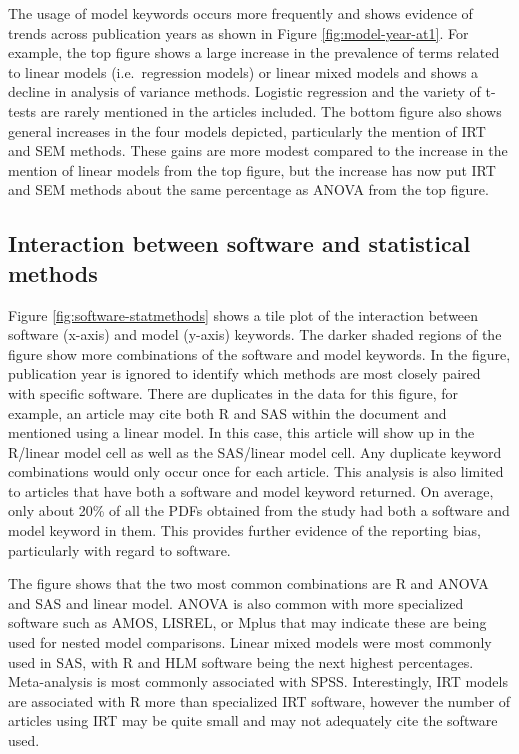\documentclass[
  english,
  ,man]{apa6}
\begin{document}
The usage of model keywords occurs more frequently and shows evidence of trends across publication years as shown in Figure \ref{fig:model-year-at1}. For example, the top figure shows a large increase in the prevalence of terms related to linear models (i.e.~regression models) or linear mixed models and shows a decline in analysis of variance methods. Logistic regression and the variety of t-tests are rarely mentioned in the articles included. The bottom figure also shows general increases in the four models depicted, particularly the mention of IRT and SEM methods. These gains are more modest compared to the increase in the mention of linear models from the top figure, but the increase has now put IRT and SEM methods about the same percentage as ANOVA from the top figure.

\hypertarget{interaction-between-software-and-statistical-methods}{%
\subsection{Interaction between software and statistical methods}\label{interaction-between-software-and-statistical-methods}}

Figure \ref{fig:software-statmethods} shows a tile plot of the interaction between software (x-axis) and model (y-axis) keywords. The darker shaded regions of the figure show more combinations of the software and model keywords. In the figure, publication year is ignored to identify which methods are most closely paired with specific software. There are duplicates in the data for this figure, for example, an article may cite both R and SAS within the document and mentioned using a linear model. In this case, this article will show up in the R/linear model cell as well as the SAS/linear model cell. Any duplicate keyword combinations would only occur once for each article. This analysis is also limited to articles that have both a software and model keyword returned. On average, only about 20\% of all the PDFs obtained from the study had both a software and model keyword in them. This provides further evidence of the reporting bias, particularly with regard to software.

The figure shows that the two most common combinations are R and ANOVA and SAS and linear model. ANOVA is also common with more specialized software such as AMOS, LISREL, or Mplus that may indicate these are being used for nested model comparisons. Linear mixed models were most commonly used in SAS, with R and HLM software being the next highest percentages. Meta-analysis is most commonly associated with SPSS. Interestingly, IRT models are associated with R more than specialized IRT software, however the number of articles using IRT may be quite small and may not adequately cite the software used.
\end{document}
